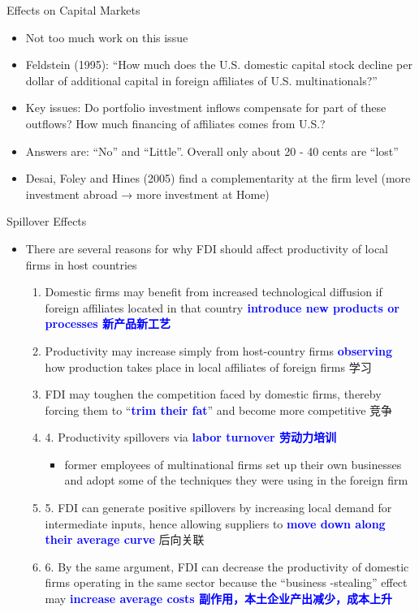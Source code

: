 \documentclass[10pt,hyperref={CJKbookmarks=true},xcolor=dvipsnames,aspectratio=169]{beamer}
\begin{document}
\begin{frame}{Effects on Capital Markets}

\begin{itemize}
\item Not too much work on this issue 
\item Feldstein (1995): “How much does the U.S. domestic capital stock decline
per dollar of additional capital in foreign affiliates of U.S. multinationals?” 
\item Key issues: Do portfolio investment inflows compensate for part of
these outflows? How much financing of affiliates comes from U.S.? 
\item Answers are: “No” and “Little”. Overall only about 20 - 40 cents are
“lost” 
\item Desai, Foley and Hines (2005) find a complementarity at the firm level
(more investment abroad → more investment at Home) 
\end{itemize}
\end{frame}

\begin{frame}{Spillover Effects}

\begin{itemize}
\item There are several reasons for why FDI should affect productivity of
local firms in host countries

\begin{enumerate}
\item Domestic firms may benefit from increased technological diffusion
if foreign affiliates located in that country\textbf{\textcolor{blue}{{}
introduce new products or processes 新产品新工艺}}
\item Productivity may increase simply from host-country firms \textbf{\textcolor{blue}{observing}}
how production takes place in local affiliates of foreign firms 学习
\item FDI may toughen the competition faced by domestic firms, thereby forcing
them to “\textbf{\textcolor{blue}{trim their fat}}” and become more
competitive 竞争
\item 4. Productivity spillovers via \textbf{\textcolor{blue}{labor turnover
		劳动力培训}}

\begin{itemize}
	\item former employees of multinational firms set up their own businesses
	and adopt some of the techniques they were using in the foreign firm 
\end{itemize}
\item 5. FDI can generate positive spillovers by increasing local demand
for intermediate inputs, hence allowing suppliers to \textbf{\textcolor{blue}{move
		down along their average curve}} 后向关联
\item 6. By the same argument, FDI can decrease the productivity of domestic
firms operating in the same sector because the “business -stealing”
effect may \textbf{\textcolor{blue}{increase average costs 副作用，本土企业产出减少，成本上升}}
\end{enumerate}
\end{itemize}
\end{frame}
\end{document}
